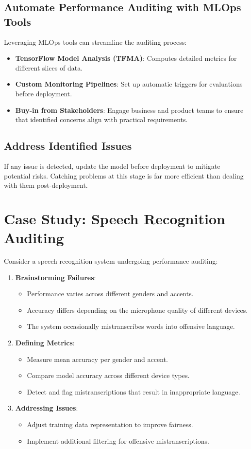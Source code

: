 \documentclass[12pt,openany]{book}
\begin{document}
\subsection{Automate Performance Auditing with MLOps Tools}
Leveraging MLOps tools can streamline the auditing process:
\begin{itemize}
    \item \textbf{TensorFlow Model Analysis (TFMA)}: Computes detailed metrics for different slices of data.
    \item \textbf{Custom Monitoring Pipelines}: Set up automatic triggers for evaluations before deployment.
    \item \textbf{Buy-in from Stakeholders}: Engage business and product teams to ensure that identified concerns align with practical requirements.
\end{itemize}

\subsection{Address Identified Issues}
If any issue is detected, update the model before deployment to mitigate potential risks. Catching problems at this stage is far more efficient than dealing with them post-deployment.

\section{Case Study: Speech Recognition Auditing}
Consider a speech recognition system undergoing performance auditing:
\begin{enumerate}
    \item \textbf{Brainstorming Failures}:
    \begin{itemize}
        \item Performance varies across different genders and accents.
        \item Accuracy differs depending on the microphone quality of different devices.
        \item The system occasionally mistranscribes words into offensive language.
    \end{itemize}
    \item \textbf{Defining Metrics}:
    \begin{itemize}
        \item Measure mean accuracy per gender and accent.
        \item Compare model accuracy across different device types.
        \item Detect and flag mistranscriptions that result in inappropriate language.
    \end{itemize}
    \item \textbf{Addressing Issues}:
    \begin{itemize}
        \item Adjust training data representation to improve fairness.
        \item Implement additional filtering for offensive mistranscriptions.
    \end{itemize}
\end{enumerate}
\end{document}

